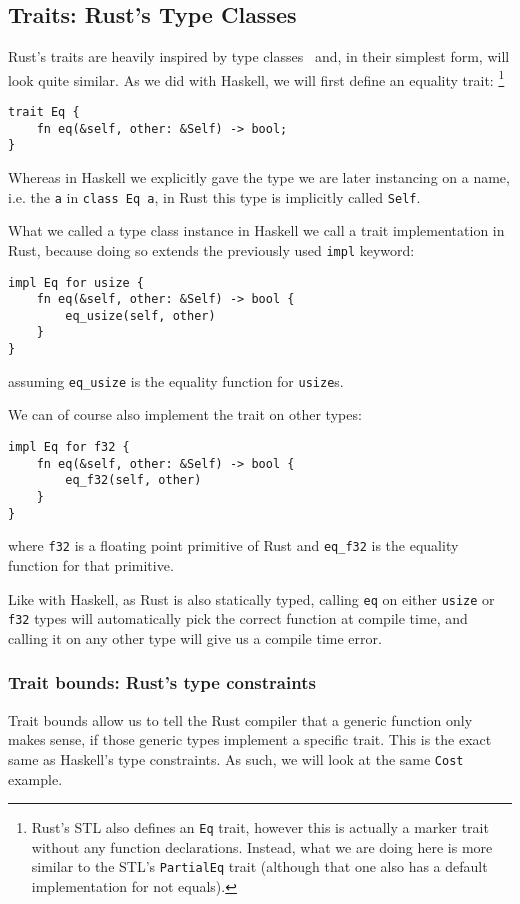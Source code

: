 \subsection{Traits: Rust's Type Classes}

Rust's traits are heavily inspired by type classes~\cite{rust-reference} and, in their simplest form, will look quite similar. As we did with Haskell, we will first define an equality trait:
\footnote{Rust's STL also defines an \verb|Eq| trait, however this is actually a marker trait without any function declarations. Instead, what we are doing here is more similar to the STL's \verb|PartialEq| trait (although that one also has a default implementation for not equals).}
\begin{verbatim}
trait Eq {
    fn eq(&self, other: &Self) -> bool;
}
\end{verbatim}

Whereas in Haskell we explicitly gave the type we are later instancing on a name, i.e. the \verb|a| in \verb|class Eq a|, in Rust this type is implicitly called \verb|Self|.

What we called a type class instance in Haskell we call a trait implementation in Rust, because doing so extends the previously used \verb|impl| keyword:
\begin{verbatim}
impl Eq for usize {
    fn eq(&self, other: &Self) -> bool {
        eq_usize(self, other)
    }
}
\end{verbatim}
assuming \verb|eq_usize| is the equality function for \verb|usize|s.

We can of course also implement the trait on other types:
\begin{verbatim}
impl Eq for f32 {
    fn eq(&self, other: &Self) -> bool {
        eq_f32(self, other)
    }
}
\end{verbatim}
where \verb|f32| is a floating point primitive of Rust and \verb|eq_f32| is the equality function for that primitive.

Like with Haskell, as Rust is also statically typed, calling \verb|eq| on either \verb|usize| or \verb|f32| types will automatically pick the correct function at compile time, and calling it on any other type will give us a compile time error.

\subsubsection{Trait bounds: Rust's type constraints}

Trait bounds allow us to tell the Rust compiler that a generic function only makes sense, if those generic types implement a specific trait. This is the exact same as Haskell's type constraints. As such, we will look at the same \verb|Cost| example.


